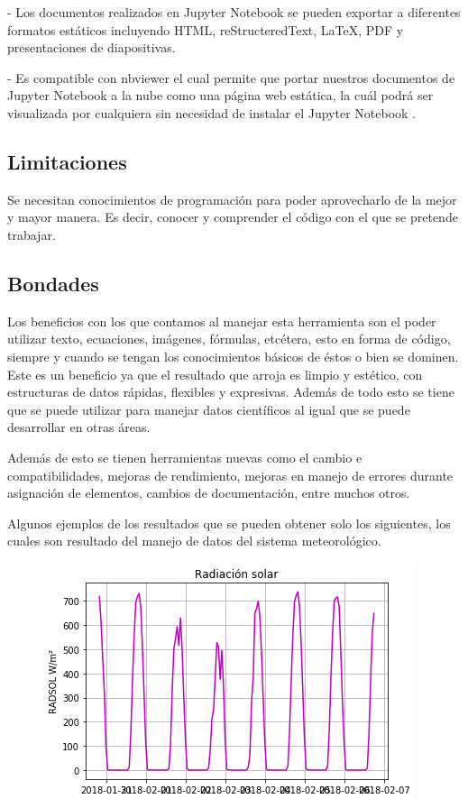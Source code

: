 \documentclass{article}
\begin{document}
- Los documentos realizados en Jupyter Notebook se pueden exportar a diferentes formatos estáticos incluyendo HTML, reStructeredText, LaTeX, PDF y presentaciones de diapositivas.

- Es compatible con nbviewer el cual permite que portar nuestros documentos de Jupyter Notebook a la nube como una página web estática, la cuál podrá ser visualizada por cualquiera sin necesidad de instalar el Jupyter Notebook .

\subsection{Limitaciones}


Se necesitan conocimientos de programación para poder aprovecharlo de la mejor y mayor manera. Es decir, conocer y comprender el código con el que se pretende trabajar.

\subsection{Bondades}

Los beneficios con los que contamos al manejar esta herramienta son el poder utilizar texto, ecuaciones, imágenes, fórmulas, etcétera, esto en forma de código, siempre y cuando se tengan los conocimientos básicos de éstos o bien se dominen. Este es un beneficio ya que el resultado que arroja es limpio y estético, con estructuras de datos rápidas, flexibles y expresivas. Además de todo esto se tiene que se puede utilizar para manejar datos científicos al igual que se puede desarrollar en otras áreas.

Además de esto se tienen herramientas nuevas como el cambio e compatibilidades, mejoras de rendimiento, mejoras en manejo de errores durante asignación de elementos, cambios de documentación, entre muchos otros.

Algunos ejemplos de los resultados que se pueden obtener solo los siguientes, los cuales son resultado del manejo de datos del sistema meteorológico.


 \begin{figure}[ht!]
  \centering
   \includegraphics[width=0.8\linewidth]{Radiacionsolar.png}
  \end{figure}
\end{document}

